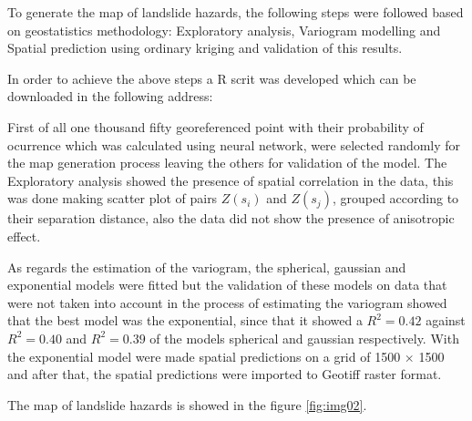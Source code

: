 \documentclass[11pt,twoside]{rmta2010esp}%
\begin{document}
To generate the map of landslide hazards, the following steps were followed based on geostatistics methodology: Exploratory analysis, Variogram modelling and Spatial prediction using ordinary kriging and validation of this results. 

In order to achieve the above steps a R scrit was developed which can be downloaded in the following address:

 

First of all one thousand fifty georeferenced point with their probability of ocurrence which was calculated using neural network, were selected randomly for the map generation process leaving the others for validation of the model. The Exploratory analysis showed the presence of spatial correlation in the data, this was done making scatter plot of pairs $Z(s_{i})$ and  $Z(s_{j})$, grouped according to their separation distance, also the data did not show the presence of anisotropic effect. 

As regards the estimation of the variogram, the spherical, gaussian and exponential models were fitted but the validation of these models on data that were not taken into account in the process of estimating the variogram showed that the best model was the exponential, since that it showed a $ R^{2} = 0.42 $ against $ R^{2} = 0.40 $ and $ R^{2} = 0.39 $ of the models spherical and gaussian respectively. With the exponential model were made spatial predictions on a grid of 1500 $\times$ 1500 and after that, the spatial predictions were imported to Geotiff raster format. 


The map of landslide hazards is showed in the figure \ref{fig:img02}.
\end{document}
